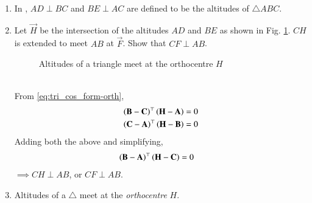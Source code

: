 %
\renewcommand{\theequation}{\theenumi}
\begin{enumerate}[label=\thesection.\arabic*.,ref=\thesection.\theenumi]
%
%
\item 
	In ,	
$AD \perp BC$ and $BE \perp AC$ are defined to be the altitudes of $\triangle ABC$. 
\item Let $\vec{H}$ be the intersection of the altitudes $AD$ and $BE$ as shown in Fig. \ref{fig:tri_alt_h}.  $CH$ is extended to meet $AB$ at $\vec{F}$.  Show that $CF \perp AB$.
%
\begin{figure}[!ht]
	\begin{center}
		\resizebox{\columnwidth}{!}{}
	\end{center}
	\caption{Altitudes of a triangle meet at the orthocentre $H$}
	\label{fig:tri_alt_h}	
\end{figure}
%
\\
\solution 
From 
\eqref{eq:tri_cos_form-orth},
%
\begin{align}
\left(\mathbf{B}-\mathbf{C}\right)^{\top}\left(\mathbf{H}-\mathbf{A}\right) &= 0  
\\
\left(\mathbf{C}-\mathbf{A}\right)^{\top}\left(\mathbf{H}-\mathbf{B}\right) &= 0  
\end{align}
%
Adding both the above and simplifying, 
%
\begin{align}
\left(\mathbf{B}-\mathbf{A}\right)^{\top}\left(\mathbf{H}-\mathbf{C}\right) &= 0  
\end{align}
%
$\implies CH \perp AB$, or $CF \perp AB$.  
%
\iffalse
The python code for  Fig. \ref{fig:tri_alt_h} is
\begin{lstlisting}
codes/triangle/tri_alt_h.py
\end{lstlisting}
%
and the equivalent latex-tikz code is
%
\begin{lstlisting}
figs/triangle/tri_alt_h.tex
\end{lstlisting}
\fi
\item Altitudes of a $\triangle$ meet at the {\em orthocentre} $H$.
%
\end{enumerate}
